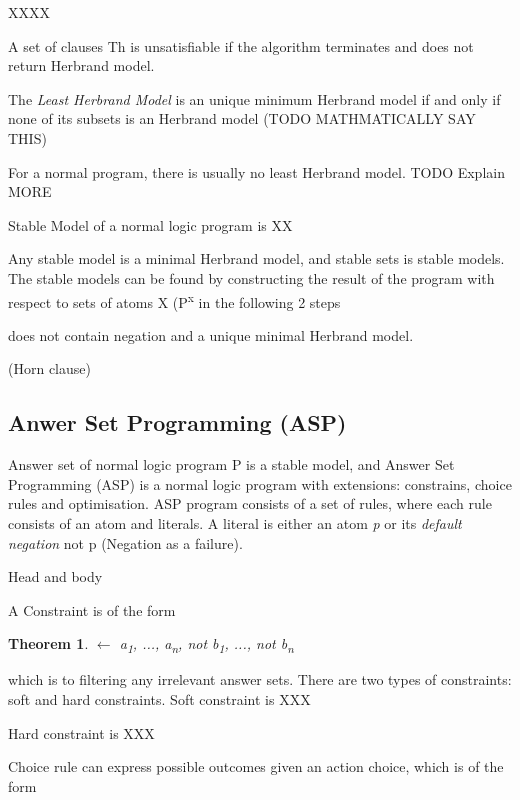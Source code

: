 \documentclass[12pt,twoside]{report}
\newtheorem{theorem}{Theorem}
\begin{document}
XXXX

A set of clauses Th is unsatisfiable if the algorithm terminates and does not return Herbrand model.

The \textit{Least Herbrand Model} is an unique minimum Herbrand model if and only if none of its subsets is an Herbrand model (TODO MATHMATICALLY SAY THIS)

For a normal program, there is usually no least Herbrand model.
TODO Explain MORE

Stable Model of a normal logic program is XX
\cite{Gelfond1988}

Any stable model is a minimal Herbrand model, and stable sets is stable models. The stable models can be found by constructing the result of the program with respect to sets of atoms X (P\textsuperscript{x} in the following 2 steps



does not contain negation and a unique minimal Herbrand model.

\begin{examp} (Horn clause)

\end{examp}


\subsection{Anwer Set Programming (ASP)}

Answer set of normal logic program P is a stable model, and Answer Set Programming (ASP) is a normal logic program with extensions: constrains, choice rules and optimisation. ASP program consists of a set of rules, where each rule consists of an atom and literals.
A literal is either an atom \textit{p} or its \textit{default negation} not p (Negation as a failure).


Head and body

A Constraint is of the form

\begin{theorem}
$\leftarrow$ a\textsubscript{1}, ..., a\textsubscript{n}, not b\textsubscript{1}, ..., not b\textsubscript{n}
\end{theorem}

which is to filtering any irrelevant answer sets.
There are two types of constraints: soft and hard constraints. Soft constraint is XXX

Hard constraint is XXX

Choice rule can express possible outcomes given an action choice, which is of the form
\end{document}
